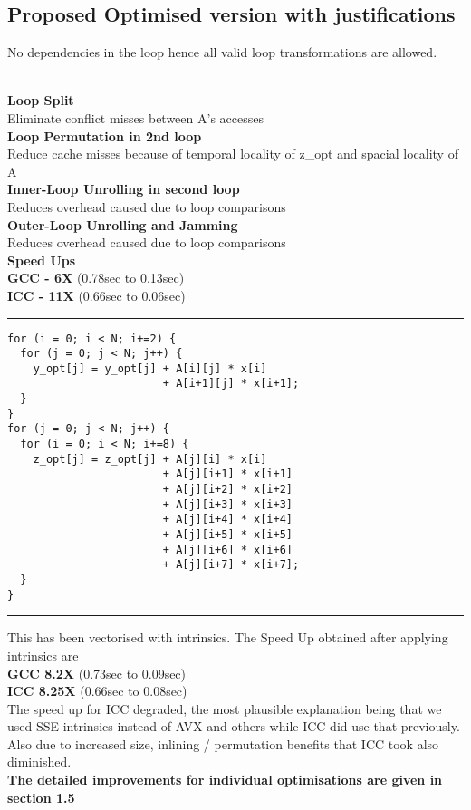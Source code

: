 \documentclass[a4paper]{article}
\begin{document}
\subsection{Proposed Optimised version with justifications}
No dependencies in the loop hence all valid loop transformations are allowed. \\ \\
\begin{minipage}{0.4\textwidth}

{\bf Loop Split} \\
Eliminate conflict misses between A's accesses \\ 

{\bf Loop Permutation in 2nd loop} \\
Reduce cache misses because of temporal locality of z\_opt and spacial locality of A \\ 

{\bf Inner-Loop Unrolling in second loop} \\
Reduces overhead caused due to loop comparisons \\ 

{\bf Outer-Loop Unrolling and Jamming} \\
Reduces overhead caused due to loop comparisons \\ 

{\bf Speed Ups } \\
{\bf GCC - 6X} (0.78sec to 0.13sec) \\
{\bf ICC - 11X} (0.66sec to 0.06sec) \\

\end{minipage}
\begin{minipage}{0.6\textwidth}
\hrule
\begin{lstlisting}
for (i = 0; i < N; i+=2) {
  for (j = 0; j < N; j++) {
    y_opt[j] = y_opt[j] + A[i][j] * x[i]
                        + A[i+1][j] * x[i+1];
  }
}
for (j = 0; j < N; j++) {
  for (i = 0; i < N; i+=8) {
    z_opt[j] = z_opt[j] + A[j][i] * x[i]
                        + A[j][i+1] * x[i+1]
                        + A[j][i+2] * x[i+2]
                        + A[j][i+3] * x[i+3]
                        + A[j][i+4] * x[i+4]
                        + A[j][i+5] * x[i+5]
                        + A[j][i+6] * x[i+6]
                        + A[j][i+7] * x[i+7];
  }
}
\end{lstlisting}
\hrule 
\end{minipage}
\vspace{0.2cm}
\newline
This has been vectorised with intrinsics. The Speed Up obtained after applying intrinsics are \\
{\bf GCC 8.2X} (0.73sec to 0.09sec) \\
{\bf ICC 8.25X} (0.66sec to 0.08sec) \\
The speed up for ICC degraded, the most plausible explanation being that we used SSE intrinsics instead of AVX and others while ICC did use that previously. Also due to increased size, inlining / permutation benefits that ICC took also diminished. \\
{\bf The detailed improvements for individual optimisations are given in section 1.5}
\end{document}

